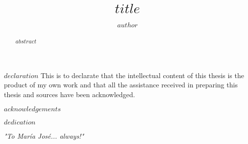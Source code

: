 \documentclass[
$if(draft)$
  draft,
$endif$
$if(fontsize)$
  $fontsize$,
$endif$
$if(margins)$
  $margins$,
$endif$
$if(spacing)$
  $spacing$,
$endif$
$if(clearpagestyle)$
  $clearpagestyle$,
$endif$
$if(notespacing)$
  $notespacing$,
$endif$
$for(classoption)$
  $classoption$$sep$,
$endfor$
]{templates/ut-thesis}
\author{$author$}
\title{$title$}
\begin{document}
\begin{preliminary}

\maketitle

\clearpage
\thispagestyle{empty}
\mbox{}
\newpage

\begin{declaration}
$declaration$ %
This is to declarate that the intellectual content of this thesis is the product of my own work and that all the assistance received in preparing this thesis and sources have been acknowledged.
\end{declaration}

\begin{acknowledgements}
$acknowledgements$ %
\end{acknowledgements}


\begin{dedication}
$dedication$ %
\vspace*{28\baselineskip}
\begin{flushright}
\textit{"To María José... always!"}
\end{flushright}
\end{dedication}



\begin{abstract}
$abstract$ %
\end{abstract}


\end{preliminary}
\end{document}
